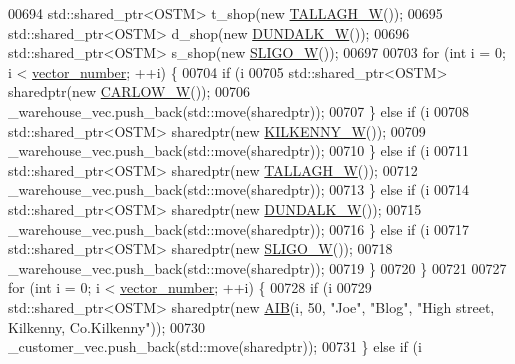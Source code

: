 \begin{DoxyCode}
00694     std::shared\_ptr<OSTM> t\_shop(\textcolor{keyword}{new} \hyperlink{class_t_a_l_l_a_g_h___w}{TALLAGH\_W}());
00695     std::shared\_ptr<OSTM> d\_shop(\textcolor{keyword}{new} \hyperlink{class_d_u_n_d_a_l_k___w}{DUNDALK\_W}());
00696     std::shared\_ptr<OSTM> s\_shop(\textcolor{keyword}{new} \hyperlink{class_s_l_i_g_o___w}{SLIGO\_W}());
00697 
00703     \textcolor{keywordflow}{for} (\textcolor{keywordtype}{int} i = 0; i < \hyperlink{main_8cpp_a988177ecdd12249ecd3a1cdc75546c44_a988177ecdd12249ecd3a1cdc75546c44}{vector\_number}; ++i) \{
00704         \textcolor{keywordflow}{if} (i %
00705             std::shared\_ptr<OSTM> sharedptr(\textcolor{keyword}{new} \hyperlink{class_c_a_r_l_o_w___w}{CARLOW\_W}());
00706             \_warehouse\_vec.push\_back(std::move(sharedptr));
00707         \} \textcolor{keywordflow}{else} \textcolor{keywordflow}{if} (i %
00708             std::shared\_ptr<OSTM> sharedptr(\textcolor{keyword}{new} \hyperlink{class_k_i_l_k_e_n_n_y___w}{KILKENNY\_W}());
00709             \_warehouse\_vec.push\_back(std::move(sharedptr));
00710         \} \textcolor{keywordflow}{else} \textcolor{keywordflow}{if} (i %
00711             std::shared\_ptr<OSTM> sharedptr(\textcolor{keyword}{new} \hyperlink{class_t_a_l_l_a_g_h___w}{TALLAGH\_W}());
00712             \_warehouse\_vec.push\_back(std::move(sharedptr));
00713         \} \textcolor{keywordflow}{else} \textcolor{keywordflow}{if} (i %
00714             std::shared\_ptr<OSTM> sharedptr(\textcolor{keyword}{new} \hyperlink{class_d_u_n_d_a_l_k___w}{DUNDALK\_W}());
00715             \_warehouse\_vec.push\_back(std::move(sharedptr));
00716         \} \textcolor{keywordflow}{else} \textcolor{keywordflow}{if} (i %
00717             std::shared\_ptr<OSTM> sharedptr(\textcolor{keyword}{new} \hyperlink{class_s_l_i_g_o___w}{SLIGO\_W}());
00718             \_warehouse\_vec.push\_back(std::move(sharedptr));
00719         \}
00720     \}
00721 
00727     \textcolor{keywordflow}{for} (\textcolor{keywordtype}{int} i = 0; i < \hyperlink{main_8cpp_a988177ecdd12249ecd3a1cdc75546c44_a988177ecdd12249ecd3a1cdc75546c44}{vector\_number}; ++i) \{
00728         \textcolor{keywordflow}{if} (i %
00729             std::shared\_ptr<OSTM> sharedptr(\textcolor{keyword}{new} \hyperlink{class_a_i_b}{AIB}(i, 50, \textcolor{stringliteral}{"Joe"}, \textcolor{stringliteral}{"Blog"}, \textcolor{stringliteral}{"High street, Kilkenny,
       Co.Kilkenny"}));
00730             \_customer\_vec.push\_back(std::move(sharedptr));
00731         \} \textcolor{keywordflow}{else} \textcolor{keywordflow}{if} (i %

\end{DoxyCode}
